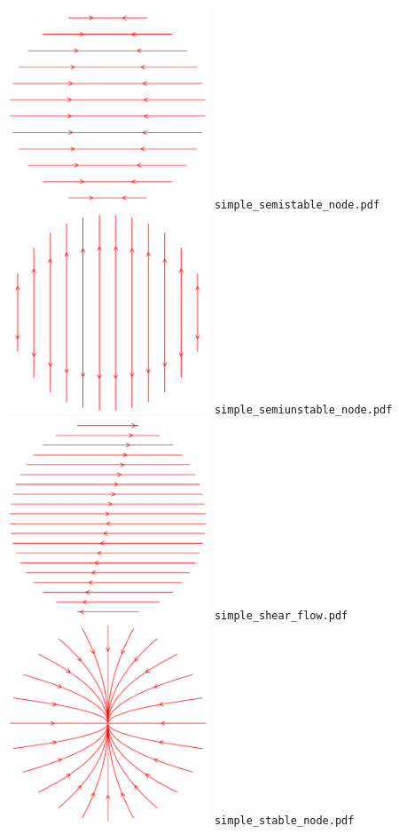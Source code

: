 \documentclass[a4paper]{amsart}
\begin{document}
\includegraphics[width=6cm]{simple_semistable_node.pdf}\verb+ simple_semistable_node.pdf+\\
\includegraphics[width=6cm]{simple_semiunstable_node.pdf}\verb+ simple_semiunstable_node.pdf+\\
\includegraphics[width=6cm]{simple_shear_flow.pdf}\verb+ simple_shear_flow.pdf+\\
\includegraphics[width=6cm]{simple_stable_node.pdf}\verb+ simple_stable_node.pdf+\\
\end{document}

